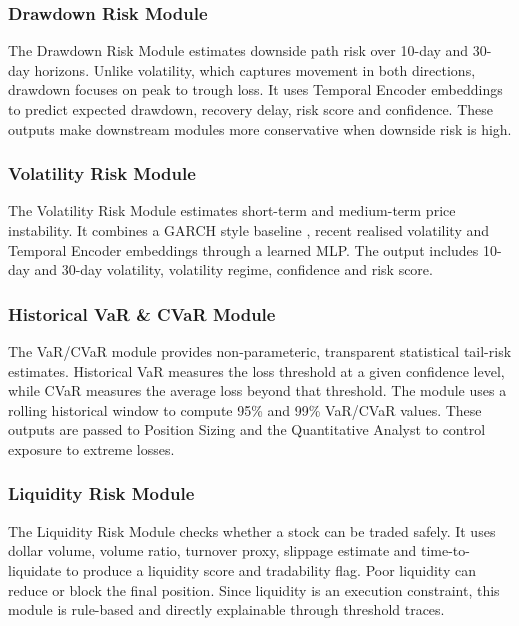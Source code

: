 \documentclass[conference]{IEEEtran}
\begin{document}
\subsubsection{Drawdown Risk Module}
The Drawdown Risk Module estimates downside path risk over 10-day and 30-day horizons. Unlike volatility, which captures movement in both directions, drawdown focuses on peak to trough loss. It uses Temporal Encoder embeddings to predict expected drawdown, recovery delay, risk score and confidence. These outputs make downstream modules more conservative when downside risk is high.

\subsubsection{Volatility Risk Module}
The Volatility Risk Module estimates short-term and medium-term price instability. It combines a GARCH style baseline \cite{GARCH}, recent realised volatility and Temporal Encoder embeddings through a learned MLP. The output includes 10-day and 30-day volatility, volatility regime, confidence and risk score. 

\subsubsection{Historical VaR \& CVaR Module}
The VaR/CVaR module provides non-parameteric, transparent statistical tail-risk estimates. Historical VaR measures the loss threshold at a given confidence level, while CVaR measures the average loss beyond that threshold. The module uses a rolling historical window to compute 95\% and 99\% VaR/CVaR values. These outputs are passed to Position Sizing and the Quantitative Analyst to control exposure to extreme losses.

\subsubsection{Liquidity Risk Module}
The Liquidity Risk Module checks whether a stock can be traded safely. It uses dollar volume, volume ratio, turnover proxy, slippage estimate and time-to-liquidate to produce a liquidity score and tradability flag. Poor liquidity can reduce or block the final position. Since liquidity is an execution constraint, this module is rule-based and directly explainable through threshold traces.
\end{document}
